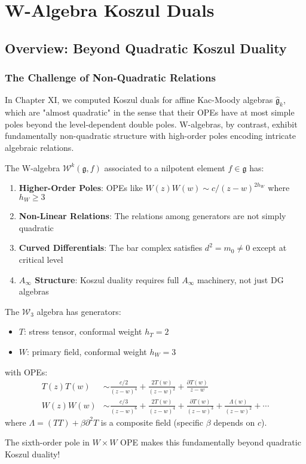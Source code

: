 \chapter{W-Algebra Koszul Duals}\label{chap:w-algebra-koszul}

\section{Overview: Beyond Quadratic Koszul Duality}

\subsection{The Challenge of Non-Quadratic Relations}

In Chapter XI, we computed Koszul duals for affine Kac-Moody algebras $\widehat{\mathfrak{g}}_k$, which are "almost quadratic" in the sense that their OPEs have at most simple poles beyond the level-dependent double poles. W-algebras, by contrast, exhibit fundamentally non-quadratic structure with high-order poles encoding intricate algebraic relations.

\begin{principle}
The W-algebra $\mathcal{W}^k(\mathfrak{g}, f)$ associated to a nilpotent element $f \in \mathfrak{g}$ has:
\begin{enumerate}
\item \textbf{Higher-Order Poles}: OPEs like $W(z)W(w) \sim c/(z-w)^{2h_W}$ where $h_W \geq 3$
\item \textbf{Non-Linear Relations}: The relations among generators are not simply quadratic
\item \textbf{Curved Differentials}: The bar complex satisfies $d^2 = m_0 \neq 0$ except at critical level
\item \textbf{$A_\infty$ Structure}: Koszul duality requires full $A_\infty$ machinery, not just DG algebras
\end{enumerate}
\end{principle}

\begin{example}\label{ex:w3-ope-structure}
The $\mathcal{W}_3$ algebra has generators:
\begin{itemize}
\item $T$: stress tensor, conformal weight $h_T = 2$
\item $W$: primary field, conformal weight $h_W = 3$
\end{itemize}
with OPEs:
\begin{align}
T(z)T(w) &\sim \frac{c/2}{(z-w)^4} + \frac{2T(w)}{(z-w)^2} + \frac{\partial T(w)}{z-w} \\
W(z)W(w) &\sim \frac{c/3}{(z-w)^6} + \frac{2T(w)}{(z-w)^4} + \frac{\partial T(w)}{(z-w)^3} + \frac{\Lambda(w)}{(z-w)^2} + \cdots
\end{align}
where $\Lambda = (TT) + \beta \partial^2 T$ is a composite field (specific $\beta$ depends on $c$).

The sixth-order pole in $W \times W$ OPE makes this fundamentally beyond quadratic Koszul duality!
\end{example}

